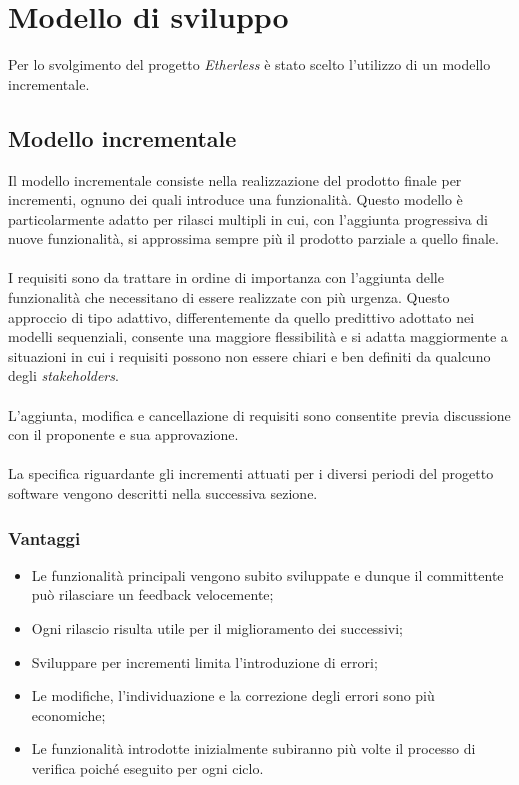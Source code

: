 \section{Modello di sviluppo}
Per lo svolgimento del progetto \textit{Etherless} è stato scelto l'utilizzo di un modello incrementale.
\subsection{Modello incrementale}
Il modello incrementale consiste nella realizzazione del prodotto finale per incrementi, ognuno dei quali introduce una funzionalità. Questo modello è particolarmente adatto per rilasci multipli in cui, con l'aggiunta progressiva di nuove funzionalità, si approssima sempre più il prodotto parziale a quello finale.\\\\
 I requisiti sono da trattare in ordine di importanza con l'aggiunta delle funzionalità che necessitano di essere realizzate con più urgenza. Questo approccio di tipo adattivo, differentemente da quello predittivo adottato nei modelli sequenziali, consente una maggiore flessibilità e si adatta maggiormente a situazioni in cui i requisiti possono non essere chiari e ben definiti da qualcuno degli \textit{stakeholders\glos}. \\\\
  L'aggiunta, modifica e cancellazione di requisiti sono consentite previa discussione con il proponente e sua approvazione. \\\\
   La specifica riguardante gli incrementi attuati per i diversi periodi del progetto software vengono descritti nella successiva sezione.
\subsubsection{Vantaggi}
\begin{itemize}
	\item Le funzionalità principali vengono subito sviluppate e dunque il committente può rilasciare un feedback velocemente;
	\item Ogni rilascio risulta utile per il miglioramento dei successivi;
	\item Sviluppare per incrementi limita l'introduzione di errori;
	\item Le modifiche, l'individuazione e la correzione degli errori sono più economiche;
	\item Le funzionalità introdotte inizialmente subiranno più volte il processo di verifica poiché eseguito per ogni ciclo.
\end{itemize}
